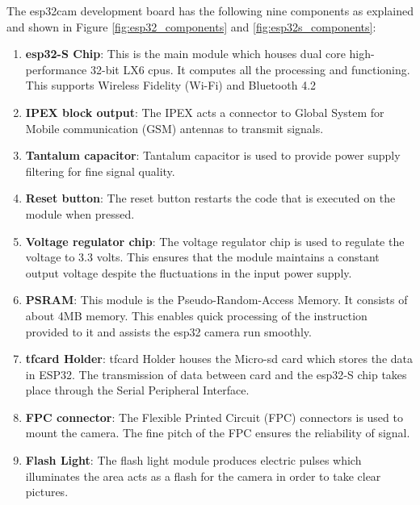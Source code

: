 The \ac{esp32cam} development board has the following nine components as explained and shown in Figure \ref{fig:esp32_components} and \ref{fig:esp32s_components}: 

\begin{enumerate}
    \item \textbf{\ac{esp32}-S Chip}: This is the main module which houses dual core high-performance 32-bit LX6 \ac{cpu}s. It computes all the processing and functioning. This supports Wireless Fidelity (Wi-Fi) and Bluetooth 4.2
    
    \item \textbf{IPEX block output}: The IPEX acts a connector to Global System for Mobile communication (GSM) antennas to transmit signals.
    
    \item \textbf{Tantalum capacitor}: Tantalum capacitor is used to provide power supply filtering for fine signal quality.
    
    \item \textbf{Reset button}: The reset button restarts the code that is executed on the module when pressed.
    
    \item \textbf{Voltage regulator chip}: The voltage regulator chip is used to regulate the voltage to 3.3 volts. This ensures that the module maintains a constant output voltage despite the fluctuations in the input power supply.
    
    \item \textbf{PSRAM}: This module is the Pseudo-Random-Access Memory. It consists of about 4MB memory. This enables quick processing of the instruction provided to it and assists the \ac{esp32} camera run smoothly.
    
    \item \textbf{\ac{tfcard} Holder}: \ac{tfcard} Holder houses the Micro-\ac{sd} card which stores the data in ESP32. The transmission of data between card and the \ac{esp32}-S chip takes place through the Serial Peripheral Interface.
    
    \item \textbf{FPC connector}: The Flexible Printed Circuit (FPC) connectors is used to mount the camera. The fine pitch of the FPC ensures the reliability of signal.
    
    \item \textbf{Flash Light}: The flash light module produces electric pulses which illuminates the area acts as a flash for the camera in order to take clear pictures.
\end{enumerate}


